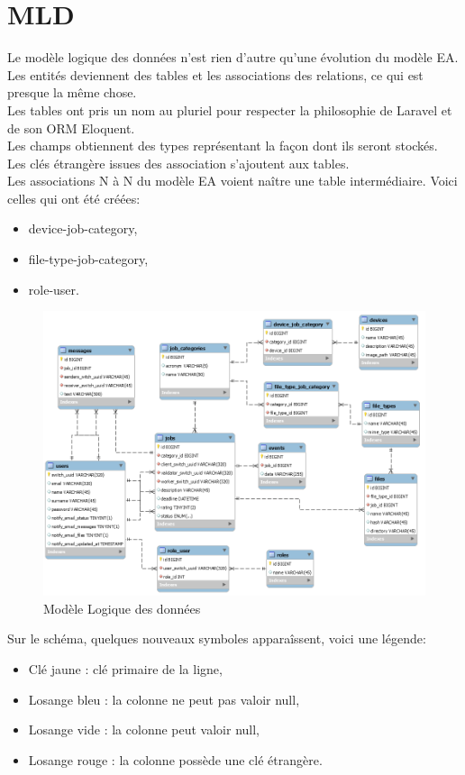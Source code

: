 \documentclass[
    iai, %
    il, %
]{heig-tb}
\begin{document}
\section{MLD}
Le modèle logique des données n'est rien d'autre qu'une évolution du modèle EA.\\
Les entités deviennent des tables et les associations des relations, ce qui est presque la même chose.\\
Les tables ont pris un nom au pluriel pour respecter la philosophie de Laravel et de son ORM Eloquent.\\
Les champs obtiennent des types représentant la façon dont ils seront stockés.\\
Les clés étrangère issues des association s'ajoutent aux tables.\\
Les associations N à N du modèle EA voient naître une table intermédiaire. Voici celles qui ont été créées:
\begin{itemize}
    \item device-job-category,
    \item file-type-job-category,
    \item role-user.
\end{itemize}

\begin{center}
    \begin{figure}
        \includegraphics[width=\textwidth]{./assets/figures/mld.png}
        \caption{Modèle Logique des données \label{mld}}
    \end{figure}
\end{center}

Sur le schéma, quelques nouveaux symboles apparaîssent, voici une légende:
\begin{itemize}
    \item Clé jaune : clé primaire de la ligne,
    \item Losange bleu : la colonne ne peut pas valoir null,
    \item Losange vide : la colonne peut valoir null,
    \item Losange rouge : la colonne possède une clé étrangère.
\end{itemize}
\end{document}
